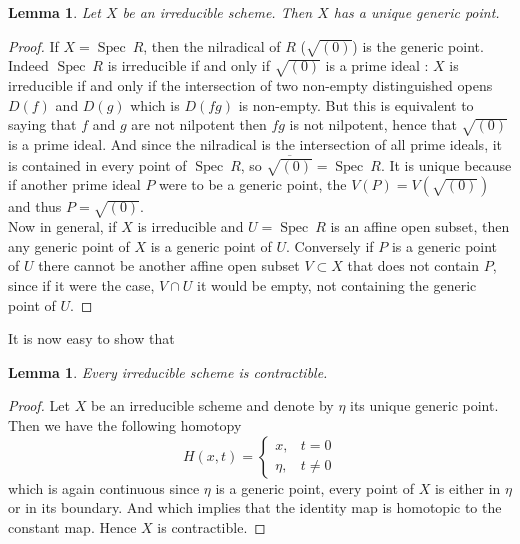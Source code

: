 \documentclass{article}
\theoremstyle{plain}
\newtheorem{lemma}[theorem]{Lemma}
\theoremstyle{definition}
\DeclareMathOperator{\Spec}{Spec}
\begin{document}
\begin{lemma}
\label{irreducible_generic_point}
    Let $X$ be an irreducible scheme. Then $X$ has a unique generic point.
\end{lemma}
\begin{proof}
    If $X=\Spec\:R$, then the nilradical of $R$ ($\sqrt{(0)}$) is the generic point. 
    Indeed $\Spec\:R$ is irreducible if and only if $\sqrt{(0)}$ is a prime ideal : 
    $X$ is irreducible if and only if the intersection of two non-empty distinguished opens $D(f)$ and $D(g)$ which is $D(fg)$ is non-empty. But this is equivalent to saying that $f$ and $g$ are not nilpotent then $fg$ is not nilpotent, hence that $\sqrt{(0)}$ is a prime ideal. 
    And since the nilradical is the intersection of all prime ideals, it is contained in every point of $\Spec\:R$, so $\overline{\sqrt{(0)}} = \Spec\:R$.
    It is unique because if another prime ideal $P$ were to be a generic point, the $V(P) = V(\sqrt{(0)})$ and thus $P = \sqrt{(0)}$.\\
    Now in general, if $X$ is irreducible and $U=\Spec\:R$ is an affine open subset, then any generic point of $X$ is a generic point of $U$. Conversely if $P$ is a generic point of $U$ there cannot be another affine open subset $V\subset X$ that does not contain $P$, since if it were the case, $V\cap U$ it would be empty, not containing the generic point of $U$.
\end{proof}

\noindent It is now easy to show that
\begin{lemma}
    Every irreducible scheme is contractible.
\end{lemma}
\begin{proof}
    Let $X$ be an irreducible scheme and denote by $\eta$ its unique generic point. Then we have the following homotopy 
    \begin{equation*}
    H(x,t)=
    \begin{cases}
        x, & t=0\\
        \eta, & t \neq 0
    \end{cases}
    \end{equation*}
    which is again continuous since $\eta$ is a generic point, every point of $X$ is either in $\eta$ or in its boundary. 
    And which implies that the identity map is homotopic to the constant map. Hence $X$ is contractible.
\end{proof}
\end{document}
